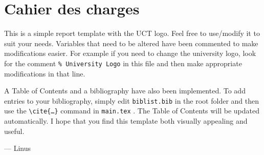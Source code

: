 \documentclass[12pt]{article}
\begin{document}

\section{Cahier des charges}
This is a simple report template with the UCT logo. Feel free to use/modify it to suit your needs. Variables that need to be altered have been commented to make modifications easier. For example if you need to change the university logo, look for the comment \texttt{\% University Logo} in this file and then make appropriate modifications in that line.

A Table of Contents and a bibliography have also been implemented. To add entries to your bibliography, simply edit \texttt{biblist.bib} in the root folder and then use the \texttt{\textbackslash cite\{\ldots\}} command in \texttt{main.tex} \cite{bibtex}. The Table of Contents will be updated automatically.
 \cite{SRF04}
I hope that you find this template both visually appealing and useful. 

\hspace{1 cm}--- Linus

\newpage


\end{document}
